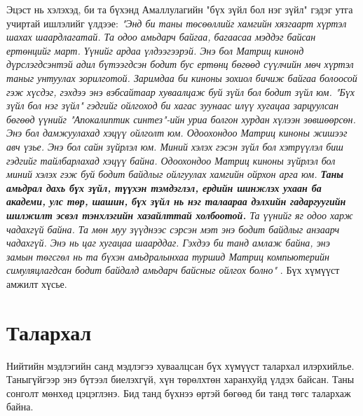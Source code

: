 \documentclass[10pt,twocolumn,letterpaper]{article}
\begin{document}
Эцэст нь хэлэхэд, би та бүхэнд Амаллулагийн "бүх зүйл бол нэг зүйл" гэдэг утга учиртай ишлэлийг үлдээе: \textit{"Энд би таны төсөөллийг хамгийн хязгаарт хүртэл шахах шаардлагатай. Та одоо амьдарч байгаа, багаасаа мэддэг байсан ертөнцийг март. Үүнийг ардаа үлдээгээрэй. Энэ бол Матриц кинонд дүрслэгдсэнтэй адил бүтээгдсэн бодит бус ертөнц бөгөөд сүүлчийн мөч хүртэл таныг унтуулах зорилготой. Заримдаа би киноны зохиол бичиж байгаа болоосой гэж хүсдэг, гэхдээ энэ вэбсайтаар хуваалцаж буй зүйл бол бодит зүйл юм. "Бүх зүйл бол нэг зүйл" гэдгийг ойлгоход би хагас зуунаас илүү хугацаа зарцуулсан бөгөөд үүнийг "Апокалиптик синтез"-ийн уриа болгон хурдан хүлээн зөвшөөрсөн. Энэ бол дамжуулахад хэцүү ойлголт юм. Одоохондоо Матриц киноны жишээг авч үзье. Энэ бол сайн зүйрлэл юм. Миний хэлэх гэсэн зүйл бол хэтрүүлэл биш гэдгийг тайлбарлахад хэцүү байна. Одоохондоо Матриц киноны зүйрлэл бол миний хэлэх гэж буй бодит байдлыг ойлгуулах хамгийн ойрхон арга юм. \textbf{Таны амьдрал дахь бүх зүйл, түүхэн тэмдэглэл, ердийн шинжлэх ухаан ба академи, улс төр, шашин, бүх зүйл нь нэг талаараа дэлхийн гадаргуугийн шилжилт эсвэл тэнхлэгийн хазайлттай холбоотой.} Та үүнийг яг одоо харж чадахгүй байна. Та мөн муу зүүднээс сэрсэн мэт энэ бодит байдлыг анзаарч чадахгүй. Энэ нь цаг хугацаа шаарддаг. Гэхдээ би танд амлаж байна, энэ замын төгсгөл нь та бүхэн амьдралынхаа туршид Матриц компьютерийн симуляцлагдсан бодит байдалд амьдарч байсныг ойлгох болно"} \cite{33,34}.
Бүх хүмүүст амжилт хүсье.

\section{Талархал}

Нийтийн мэдлэгийн санд мэдлэгээ хуваалцсан бүх хүмүүст талархал илэрхийлье. Таныгүйгээр энэ бүтээл биелэхгүй, хүн төрөлхтөн харанхуйд үлдэх байсан. Таны сонголт мөнхөд цэцэглэнэ. Бид танд бүхнээ өртэй бөгөөд би танд төгс талархаж байна.
\clearpage
\twocolumn

{\small
\renewcommand{\refname}{Лавлагаа}


}
\end{document}

